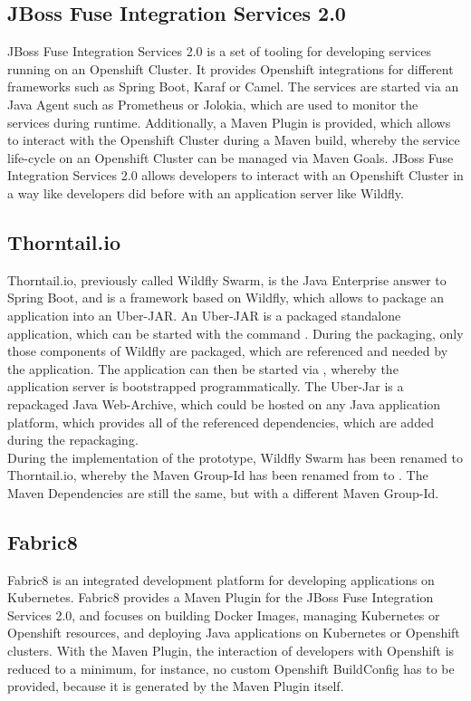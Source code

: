 \subsection{JBoss Fuse Integration Services 2.0}
\label{sec:esbi-technology-fis}
JBoss Fuse Integration Services 2.0 is a set of tooling for developing services running on an Openshift Cluster. It provides Openshift integrations for different frameworks such as Spring Boot, Karaf or Camel. The services are started via an Java Agent such as Prometheus or Jolokia, which are used to monitor the services during runtime. Additionally, a Maven Plugin is provided, which allows to interact with the Openshift Cluster during a Maven build, whereby the service life-cycle on an Openshift Cluster can be managed via Maven Goals. JBoss Fuse Integration Services 2.0 allows developers to interact with an Openshift Cluster in a way like developers did before with an application server like Wildfly\cite{Prometheus2018, Jolokia2018}.

\subsection{Thorntail.io}
\label{sec:esbi-technology-swarm}
Thorntail.io, previously called Wildfly Swarm, is the Java Enterprise answer to Spring Boot, and is a framework based on Wildfly, which allows to package an application into an Uber-JAR. An Uber-JAR is a packaged standalone application, which can be started with the command . During the packaging, only those components of Wildfly are packaged, which are referenced and needed by the application. The application can then be started via , whereby the application server is bootstrapped programmatically. The Uber-Jar is a repackaged Java Web-Archive, which could be hosted on any Java application platform, which provides all of the referenced dependencies, which are added during the repackaging\cite{WildflySwarm2018,Wildfly2017}.  \\

During the implementation of the prototype, Wildfly Swarm has been renamed to Thorntail.io, whereby the Maven Group-Id has been renamed from  to . The Maven Dependencies are still the same, but with a different Maven Group-Id.

\subsection{Fabric8}
\label{sec:esbi-technology-f8}
Fabric8 is an integrated development platform for developing applications on Kubernetes. Fabric8 provides a  Maven Plugin for the JBoss Fuse Integration Services 2.0, and focuses on building Docker Images, managing Kubernetes or Openshift resources, and deploying Java applications on Kubernetes or Openshift clusters. With the Maven Plugin, the interaction of developers with Openshift is reduced to a minimum, for instance, no custom Openshift BuildConfig has to be provided, because it is generated by the Maven Plugin itself\cite{Fabric82018}. \\

